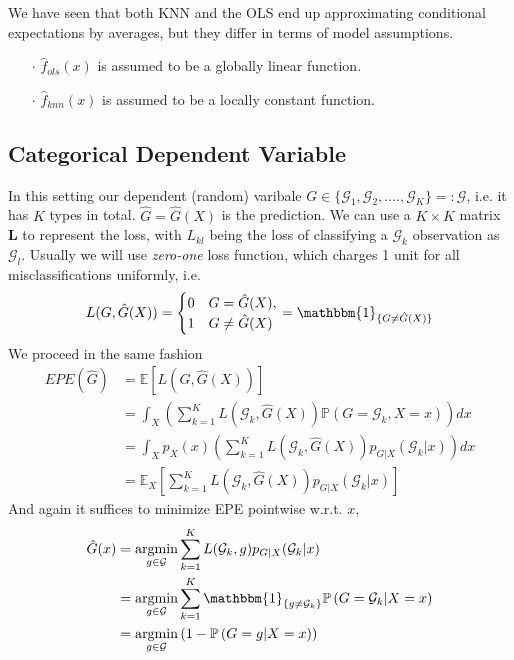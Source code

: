 \documentclass[a4paper, 11pt]{article}
\DeclareMathOperator*{\argmin}{argmin}
\begin{document}
We have seen that both KNN and the OLS end up approximating conditional expectations by averages, but they differ in terms of model assumptions.
\begin{itemize}
	\item[$\cdot$] $\hat{f}_{ols}(x)$ is assumed to be a globally linear function.
	\item[$\cdot$] $\hat{f}_{knn}(x)$ is assumed to be a locally constant function. 
\end{itemize}

\subsection{Categorical Dependent Variable}
In this setting our dependent (random) varibale $G\in \{\mathcal{G}_1, \mathcal{G}_2, ...., \mathcal{G}_K\} =: \mathcal{G}$, i.e. it has $K$ types in total. $\hat{G}=\hat{G}(X)$ is the prediction. We can use a $K\times K$ matrix $\bm{L}$ to represent the loss, with $L_{kl}$ being the loss of classifying a $\mathcal{G}_k$ observation as $\mathcal{G}_l$. Usually we will use \emph{zero-one} loss function, which charges 1 unit for all misclassifications uniformly, i.e.
\begin{equation}
	L(G, \hat{G}(X)) = 
	\begin{cases}
	0 & G = \hat{G}(X),\\
	1 & G \ne \hat{G}(X)
	\end{cases}
	= \mathbbm{1}_{\{G \ne \hat{G}(X)\}}
\end{equation}
We proceed in the same fashion
\begin{equation}
	\begin{split}
		EPE(\hat{G}) &= \mathbb{E}\left[L(G, \hat{G}(X))\right] \\
		&= \int_X \left(\sum_{k=1}^K L(\mathcal{G}_k, \hat{G}(X)) \mathbb{P}\left(G=\mathcal{G}_k, X=x\right) \right)d x \\
		&= \int_X p_{X}(x)\left(\sum_{k=1}^K L(\mathcal{G}_k, \hat{G}(X)) p_{G|X}(\mathcal{G}_k|x) \right)d x \\
		&= \mathbb{E}_X\left[\sum_{k=1}^K L(\mathcal{G}_k, \hat{G}(X)) p_{G|X}(\mathcal{G}_k|x)\right]
	\end{split}
\end{equation}
And again it suffices to minimize EPE pointwise w.r.t. $x$,
\begin{equation}
\begin{split}
	\hat{G}(x) &= \argmin\limits_{g \in \mathcal{G}} 	\sum_{k=1}^K L(\mathcal{G}_k, g) p_{G|X}(\mathcal{G}_k|x) \\
	&= \argmin\limits_{g \in \mathcal{G}} 	\sum_{k=1}^K \mathbbm{1}_{\{g\ne\mathcal{G}_k\}} \mathbb{P}\left(G=\mathcal{G}_k|X=x\right)\\
	&= \argmin\limits_{g \in \mathcal{G}} \left(1- \mathbb{P}\left(G=g|X=x\right)\right)
\end{split}
\end{equation}
\end{document}
